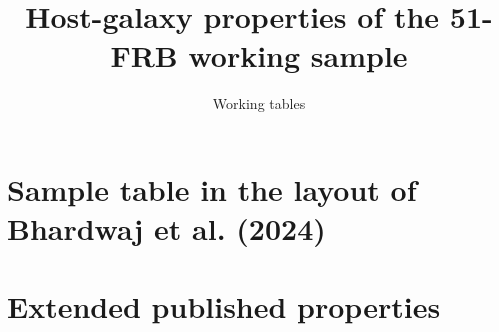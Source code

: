 \documentclass[longrotatetable]{aastex701}
\begin{document}
\title{Host-galaxy properties of the 51-FRB working sample}
\author{Working tables}

\section{Sample table in the layout of Bhardwaj et al. (2024)}


\section{Extended published properties}




\end{document}
